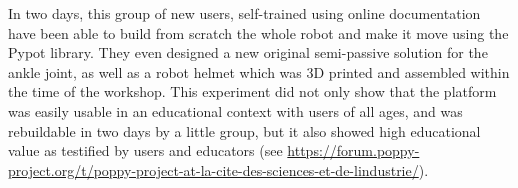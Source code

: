 \begin{figure}[]
\centering
    \hfil
    \caption{}
    \label{fig:universience_hackathon_orga}
\end{figure}

In two days, this group of new users, self-trained using online documentation have been able to build from scratch the whole robot and make it move using the Pypot library. They even designed a new original semi-passive solution for the ankle joint, as well as a robot helmet which was 3D printed and assembled within the time of the workshop. This experiment did not only show that the platform was easily usable in an educational context with users of all ages, and was rebuildable in two days by a little group, but it also showed high educational value as testified by users and educators (see \url{https://forum.poppy-project.org/t/poppy-project-at-la-cite-des-sciences-et-de-lindustrie/}).

\begin{figure}[]
\centering
    \hfil
    \hfil
    \caption{}
    \label{fig:universience_conception}
\end{figure}


\begin{figure}[]
\centering
    \hfil
    \newline
    \hfil
    \caption{}
    \label{fig:universience_assembly}
\end{figure}

\begin{figure}[]
\centering
    \hfil
    \caption{}
    \label{fig:universience_conception}
\end{figure}




